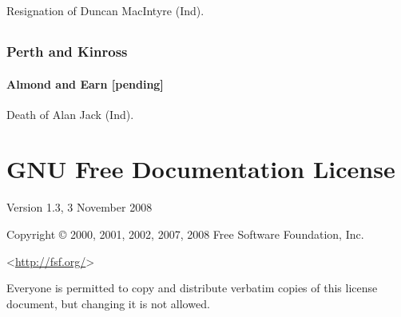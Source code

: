 \documentclass[a4paper,openany]{book}
\begin{document}
\begin{resultsiii}

Resignation of Duncan MacIntyre (Ind).

\section[Tay Councils]{}

\subsection*{Perth and Kinross}

\subsubsection*{Almond and Earn \hspace*{\fill}\nolinebreak[1]%
\enspace\hspace*{\fill}
[pending]}


Death of Alan Jack (Ind).

\end{resultsiii}

\clearpage
{}
{\scriptsize%
\frenchspacing\printindex}
\thispagestyle{plain}

\chapter*{{GNU Free Documentation License}}
\pagestyle{plain}

 Version 1.3, 3 November 2008


 Copyright \copyright{} 2000, 2001, 2002, 2007, 2008 Free Software Foundation, Inc.
 
 \bigskip
 
 <\url{http://fsf.org/}>
 
 \bigskip
 
 Everyone is permitted to copy and distribute verbatim copies
 of this license document, but changing it is not allowed.
\end{document}
